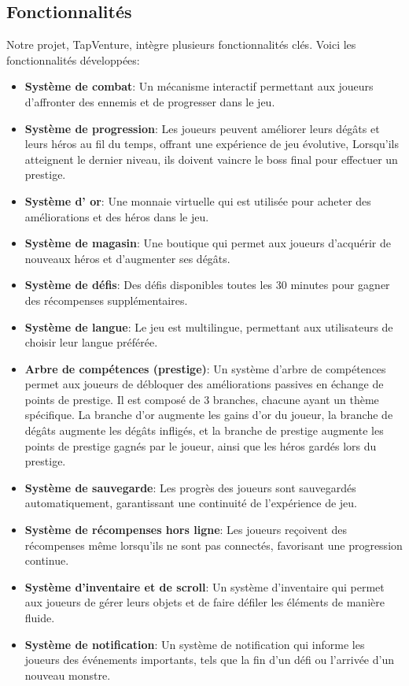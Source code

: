 \documentclass[11pt,a4paper]{article}
\begin{document}
\subsection{Fonctionnalités}
Notre projet, TapVenture, intègre plusieurs fonctionnalités clés. Voici les fonctionnalités développées:
\begin{itemize}
    \item \textbf{Système de combat}: Un mécanisme interactif permettant aux joueurs d'affronter des ennemis et de progresser dans le jeu.
    \item \textbf{Système de progression}: Les joueurs peuvent améliorer leurs dégâts et leurs héros au fil du temps, offrant une expérience de jeu évolutive, Lorsqu'ils atteignent le dernier niveau, ils doivent vaincre le boss final pour effectuer un prestige.
    \item \textbf{Système d' or}: Une monnaie virtuelle qui est utilisée pour acheter des améliorations et des héros dans le jeu.
    \item \textbf{Système de magasin}: Une boutique qui permet aux joueurs d'acquérir de nouveaux héros et d'augmenter ses dégâts.
    \item \textbf{Système de défis}: Des défis disponibles toutes les 30 minutes pour gagner des récompenses supplémentaires.
    \item \textbf{Système de langue}: Le jeu est multilingue, permettant aux utilisateurs de choisir leur langue préférée.
    \item \textbf{Arbre de compétences (prestige)}: Un système d'arbre de compétences permet aux joueurs de débloquer des améliorations passives en échange de points de prestige.
        Il est composé de 3 branches, chacune ayant un thème spécifique.
        La branche d'or augmente les gains d'or du joueur, la branche de dégâts augmente les dégâts infligés, et la branche de prestige augmente les points de prestige gagnés par le joueur, ainsi que les héros gardés lors du prestige.
    \item \textbf{Système de sauvegarde}: Les progrès des joueurs sont sauvegardés automatiquement, garantissant une continuité de l'expérience de jeu.
    \item \textbf{Système de récompenses hors ligne}: Les joueurs reçoivent des récompenses même lorsqu'ils ne sont pas connectés, favorisant une progression continue.
    \item \textbf{Système d'inventaire et de scroll}: Un système d'inventaire qui permet aux joueurs de gérer leurs objets et de faire défiler les éléments de manière fluide.
    \item \textbf{Système de notification}: Un système de notification qui informe les joueurs des événements importants, tels que la fin d'un défi ou l'arrivée d'un nouveau monstre.
\end{itemize}
\end{document}
